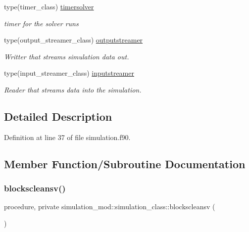 \begin{DoxyCompactItemize}
type(timer\+\_\+class) \mbox{\hyperlink{structsimulation__mod_1_1simulation__class_a25e03717a6e87410b816ac1f299b282b}{timersolver}}
\begin{DoxyCompactList}\small\item\em timer for the solver runs \end{DoxyCompactList}\item 
type(output\+\_\+streamer\+\_\+class) \mbox{\hyperlink{structsimulation__mod_1_1simulation__class_a75e838871eedd2fd66dc7d9bfce015ad}{outputstreamer}}
\begin{DoxyCompactList}\small\item\em Writter that streams simulation data out. \end{DoxyCompactList}\item 
type(input\+\_\+streamer\+\_\+class) \mbox{\hyperlink{structsimulation__mod_1_1simulation__class_a40add8001e631510e3530931b9a9d06a}{inputstreamer}}
\begin{DoxyCompactList}\small\item\em Reader that streams data into the simulation. \end{DoxyCompactList}\end{DoxyCompactItemize}


\subsection{Detailed Description}


Definition at line 37 of file simulation.\+f90.



\subsection{Member Function/\+Subroutine Documentation}
\mbox{\label{structsimulation__mod_1_1simulation__class_a468cbc4545886a696123087bfaf42de4}} 
\subsubsection{\texorpdfstring{blockscleansv()}{blockscleansv()}}
{\footnotesize\ttfamily procedure, private simulation\+\_\+mod\+::simulation\+\_\+class\+::blockscleansv (\begin{DoxyParamCaption}{ }\end{DoxyParamCaption})\hspace{0.3cm}{\ttfamily [private]}}



